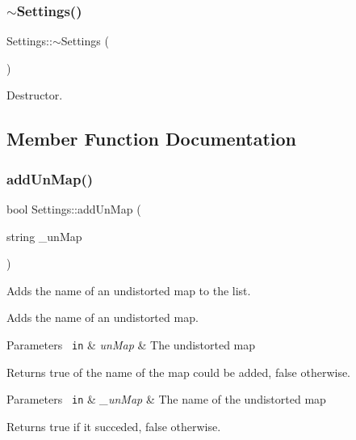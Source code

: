 \subsubsection{\texorpdfstring{$\sim$Settings()}{~Settings()}}
{\footnotesize\ttfamily Settings\+::$\sim$\+Settings (\begin{DoxyParamCaption}{ }\end{DoxyParamCaption})}



Destructor. 



\subsection{Member Function Documentation}
\mbox{\label{class_settings_aeee4537bd39c18ca3a711a73c9c2277e}} 
\subsubsection{\texorpdfstring{addUnMap()}{addUnMap()}}
{\footnotesize\ttfamily bool Settings\+::add\+Un\+Map (\begin{DoxyParamCaption}\item[{string}]{\+\_\+un\+Map }\end{DoxyParamCaption})}



Adds the name of an undistorted map to the list. 

Adds the name of an undistorted map.


\begin{DoxyParams}[1]{Parameters}
\mbox{\texttt{ in}}  & {\em un\+Map} & The undistorted map\\
\hline
\end{DoxyParams}
\begin{DoxyReturn}{Returns}
{\ttfamily true} of the name of the map could be added, {\ttfamily false} otherwise.
\end{DoxyReturn}

\begin{DoxyParams}[1]{Parameters}
\mbox{\texttt{ in}}  & {\em \+\_\+un\+Map} & The name of the undistorted map \\
\hline
\end{DoxyParams}
\begin{DoxyReturn}{Returns}
{\ttfamily true} if it succeded, {\ttfamily false} otherwise. 
\end{DoxyReturn}
\mbox{\label{class_settings_ad0d55c536a84990b048463b924c7d88e}} 
